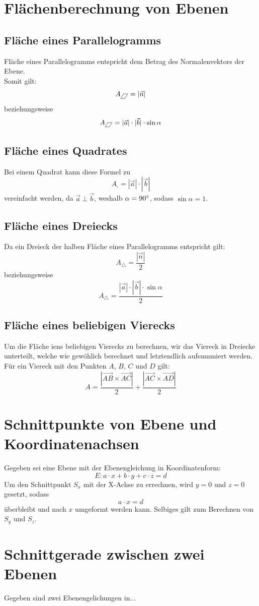 \documentclass[a4paper,12pt]{article}
\newcommand*{\Parallelogramm}[1][]{%
  \pgfpicture\pgfsetroundjoin
    \pgftransformxslant{.6}%
    \pgfpathrectangle{\pgfpointorigin}{\pgfpoint{.60em}{.65em}}%
    \pgfusepath{stroke,#1}%
  \endpgfpicture}
\begin{document}
\section{Flächenberechnung von Ebenen}
\subsection{Fläche eines Parallelogramms}
Fläche eines Parallelogramms entspricht dem Betrag des Normalenvektors der Ebene.\\
Somit gilt:
$$A_{\Parallelogramm} = |\vec{n}|$$
beziehungsweise
$$A_{\Parallelogramm} = |\vec{a}| \cdot |\vec{b}| \cdot \sin{\alpha}$$
\subsection{Fläche eines Quadrates}
Bei einem Quadrat kann diese Formel zu
$$A_{\square} = |\vec{a}| \cdot |\vec{b}|$$
vereinfacht werden, da $\vec{a}\ \bot\ \vec{b}$, weshalb $\alpha = 90\degree$, sodass $\sin{\alpha} = 1$.
\subsection{Fläche eines Dreiecks}
Da ein Dreieck der halben Fläche eines Parallelogramms entspricht gilt:
$$A_{\triangle} = \frac{|\vec{n}|}{2}$$
beziehungsweise
$$A_{\triangle} = \frac{|\vec{a}| \cdot |\vec{b}| \cdot \sin{\alpha}}{2}$$
\subsection{Fläche eines beliebigen Vierecks}
Um die Fläche iens beliebigen Vierecks zu berechnen, wir das Viereck in Dreiecke unterteilt, welche wie gewöhlich berechnet und letztendlich aufsummiert werden.\\
Für ein Viereck mit den Punkten $A$, $B$, $C$ und $D$ gilt:
$$A = \frac{|\vec{AB} \times \vec{AC}|}{2} + \frac{|\vec{AC} \times \vec{AD}|}{2}$$
\section{Schnittpunkte von Ebene und Koordinatenachsen}
Gegeben sei eine Ebene mit der Ebenengleichung in Koordinatenform:\\
$$E : a \cdot x + b \cdot y + c \cdot z = d$$
Um den Schnittpunkt $S_x$ mit der X-Achse zu errechnen, wird $y = 0$ und $z = 0$ gesetzt, sodass
$$a \cdot x = d$$
überbleibt und nach $x$ umgeformt werden kann. Selbiges gilt zum Berechnen von $S_y$ und $S_z$.
\section{Schnittgerade zwischen zwei Ebenen}
Gegeben sind zwei Ebenengelichungen in...
\end{document}

